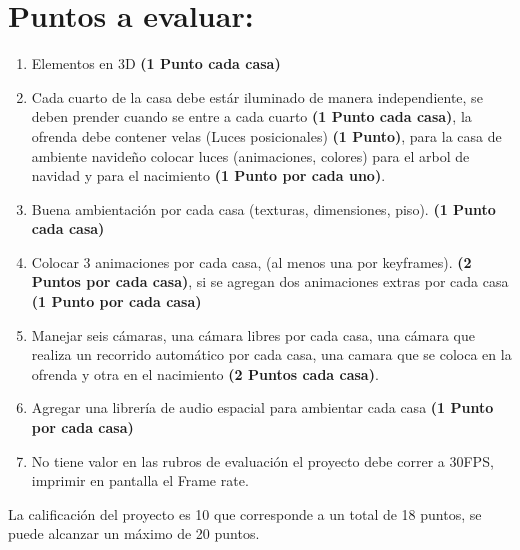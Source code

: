 \documentclass[12pt,letterpaper]{article}
\begin{document}
\section*{Puntos a evaluar:}
\begin{enumerate}
\item Elementos en 3D \textbf{(1 Punto cada casa)}
\item Cada cuarto de la casa debe estár iluminado de manera independiente, se deben prender cuando se entre a cada cuarto \textbf{(1 Punto cada casa)}, la ofrenda debe contener velas (Luces posicionales) \textbf{(1 Punto)}, para la casa de ambiente navideño colocar luces (animaciones, colores) para el arbol de navidad y para el nacimiento \textbf{(1 Punto por cada uno)}.
\item Buena ambientación por cada casa (texturas, dimensiones, piso). \textbf{(1 Punto cada casa)}
\item Colocar 3 animaciones por cada casa, (al menos una por keyframes). \textbf{(2 Puntos por cada casa)}, si se agregan dos animaciones extras por cada casa \textbf{(1 Punto por cada casa)}
\item Manejar seis cámaras, una cámara libres por cada casa, una cámara que realiza un recorrido automático por cada casa, una camara que se coloca en la ofrenda y otra en el nacimiento \textbf{(2 Puntos cada casa)}.
\item Agregar una librería de audio espacial para ambientar cada casa \textbf{(1 Punto por cada casa)}
\item No tiene valor en las rubros de evaluación el proyecto debe correr a 30FPS, imprimir
en pantalla el Frame rate.
\end{enumerate}

La calificación del proyecto es 10 que corresponde a un total de 18 puntos, se puede alcanzar un máximo de 20 puntos.
\end{document}
